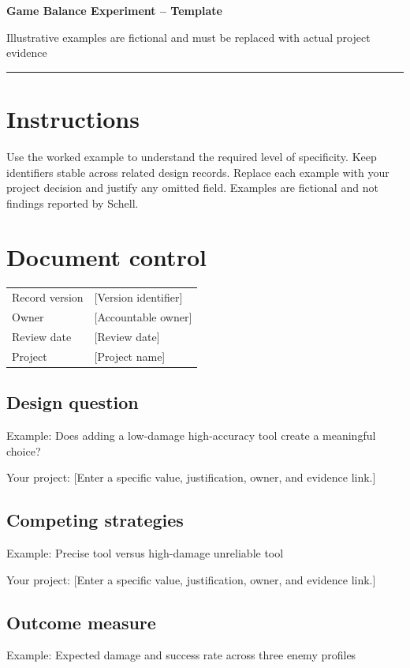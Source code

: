 \documentclass[11pt]{article}
\begin{document}
{\huge\bfseries\color{suiteblue} Game Balance Experiment -- Template}\par
\vspace{0.15in}
{\normalsize\color{suitegray} Illustrative examples are fictional and must be replaced with actual project evidence}\par
\vspace{0.15in}\hrule\vspace{0.15in}

\section{Instructions}
Use the worked example to understand the required level of specificity. Keep identifiers stable across related design records. Replace each example with your project decision and justify any omitted field. Examples are fictional and not findings reported by Schell.


\section{Document control}
\begin{tabularx}{\linewidth}{@{}lX@{}}\toprule Record version & [Version identifier]\\ Owner & [Accountable owner]\\ Review date & [Review date]\\ Project & [Project name]\\\bottomrule\end{tabularx}

\subsection{Design question}
Example: Does adding a low-damage high-accuracy tool create a meaningful choice?

Your project: [Enter a specific value, justification, owner, and evidence link.]


\subsection{Competing strategies}
Example: Precise tool versus high-damage unreliable tool

Your project: [Enter a specific value, justification, owner, and evidence link.]


\subsection{Outcome measure}
Example: Expected damage and success rate across three enemy profiles
\end{document}
